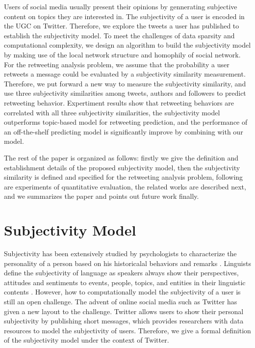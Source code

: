 \documentclass[letterpaper]{article}
\begin{document}
Users of social media usually present their opinions by gennerating subjective content on topics they are interested in. 
The subjectivity of a user is encoded in the UGC on Twitter. 
Therefore, we explore the tweets a user has published to establish the subjectivity model. 
To meet the challenges of data sparsity and computational complexity, we design an algorithm to build the subjectivity model by making use of the local network structure and homophily of social network. 
For the retweeting analysis problem, we assume that the probability a user retweets a message could be evaluated by a subjectivity similarity measurement. 
Therefore, we put forward a new way to measure the subjectivity similarity, and use three subjectivity similarities among tweets, authors and followers to predict retweeting behavior. 
Expertiment results show that retweeting behaviors are correlated with all three subjectivity similarities, the subjectivity model outperforms topic-based model for retweeting prediction, and the performance of an off-the-shelf predicting model is significantly improve by combining with our model. 

The rest of the paper is organized as follows: firstly we give the definition and establishment details of the proposed subjectivity model, then the subjectivity similarity is defined and specified for the retweeting analysis problem, following are experiments of quantitative evaluation, the related works are described next, and we summarizes the paper and points out future work finally.

\section{Subjectivity Model}
\label{subjectivemodel}

Subjectivity has been extensively studied by psychologists to characterize the personality of a person based on his historicalal behaviors and remarks \cite{engbert2007agency}. 
Linguists define the subjectivity of language as speakers always show their perspectives, attitudes and sentiments to events, people, topics, and entities in their linguistic contents \cite{stein2005subjectivity}. 
However, how to computationally model the subjectivity of a user is still an open challenge. 
The advent of online social media such as Twitter has given a new layout to the challenge.  
Twitter allows users to show their personal subjectivity by publishing short messages, which provides researchers with data resources to model the subjectivity of users.
Therefore, we give a formal definition of the subjectivity model under the context of Twitter.
\end{document}
